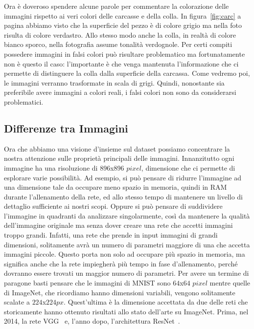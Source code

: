 Ora è doveroso spendere alcune parole per commentare la colorazione delle immagini rispetto ai veri colori delle carcasse e della colla.
In figura~\ref{fig:carc} a pagina \pageref{fig:carc} abbiamo visto che la superficie del pezzo è di colore grigio ma nella foto risulta di colore verdastro.
Allo stesso modo anche la colla, in realtà di colore bianco sporco, nella fotografia assume tonalità verdognole.
Per certi compiti possedere immagini in falsi colori può risultare problematico ma fortunatamente non è questo il caso: l'importante è che venga mantenuta l'informazione che ci permette di distinguere la colla dalla superficie della carcassa.
Come vedremo poi, le immagini verranno trasformate in scala di grigi.
Quindi, nonostante sia preferibile avere immagini a colori reali, i falsi colori non sono da considerarsi problematici.

\subsection{Differenze tra Immagini}
Ora che abbiamo una visione d'insieme sul dataset possiamo concentrare la nostra attenzione sulle proprietà principali delle immagini.
Innanzitutto ogni immagine ha una risoluzione di $896$x$896$ $pixel$, dimensione che ci permette di esplorare varie possibilità.
Ad esempio, si può pensare di ridurre l'immagine ad una dimensione tale da occupare meno spazio in memoria, quindi in RAM durante l'allenamento della rete, ed allo stesso tempo di mantenere un livello di dettaglio sufficiente ai nostri scopi.
Oppure si può pensare di suddividere l'immagine in quadranti da analizzare singolarmente, così da mantenere la qualità dell'immagine originale ma senza dover creare una rete che accetti immagini troppo grandi.
Infatti, una rete che prende in input immagini di grandi dimensioni, solitamente avrà un numero di parametri maggiore di una che accetta immagini piccole.
Questo porta non solo ad occupare più spazio in memoria, ma significa anche che la rete impiegherà più tempo in fase d'allenamento, perché dovranno essere trovati un maggior numero di parametri.
Per avere un termine di paragone basti pensare che le immagini di MNIST sono $64$x$64$ $pixel$ mentre quelle di ImageNet, che ricordiamo hanno dimensioni variabili, vengono solitamente scalate a $224$x$224px$.
Quest'ultima è la dimensione accettata da due delle reti che storicamente hanno ottenuto risultati allo stato dell'arte su ImageNet.
Prima, nel 2014, la rete VGG~\cite{vgg} e, l'anno dopo, l'architettura ResNet~\cite{resnet}.

